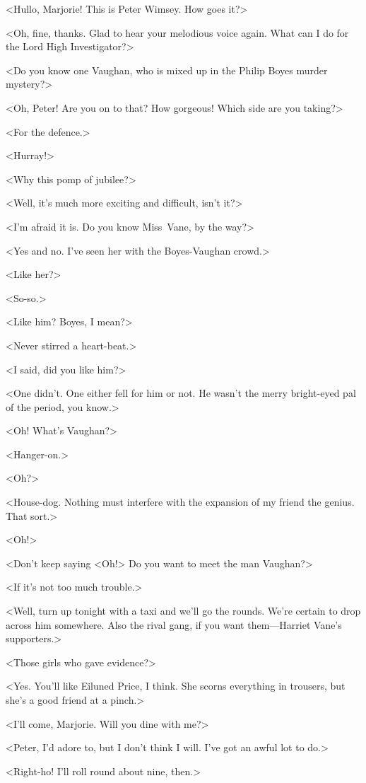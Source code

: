 <Hullo, Marjorie! This is Peter Wimsey. How goes it?>

<Oh, fine, thanks. Glad to hear your melodious voice again. What can I do for the Lord High Investigator?>

<Do you know one Vaughan, who is mixed up in the Philip Boyes murder mystery?>

<Oh, Peter! Are you on to that? How gorgeous! Which side are you taking?>

<For the defence.>

<Hurray!>

<Why this pomp of jubilee?>

<Well, it's much more exciting and difficult, isn't it?>

<I'm afraid it is. Do you know Miss~Vane, by the way?>

<Yes and no. I've seen her with the Boyes-Vaughan crowd.>

<Like her?>

<So-so.>

<Like him? Boyes, I mean?>

<Never stirred a heart-beat.>

<I said, did you like him?>

<One didn't. One either fell for him or not. He wasn't the merry bright-eyed pal of the period, you know.>

<Oh! What's Vaughan?>

<Hanger-on.>

<Oh?>

<House-dog. Nothing must interfere with the expansion of my friend the genius. That sort.>

<Oh!>

<Don't keep saying <Oh!> Do you want to meet the man Vaughan?>

<If it's not too much trouble.>

<Well, turn up tonight with a taxi and we'll go the rounds. We're certain to drop across him somewhere. Also the rival gang, if you want them—Harriet Vane's supporters.>

<Those girls who gave evidence?>

<Yes. You'll like Eiluned Price, I think. She scorns everything in trousers, but she's a good friend at a pinch.>

<I'll come, Marjorie. Will you dine with me?>

<Peter, I'd adore to, but I don't think I will. I've got an awful lot to do.>

<Right-ho! I'll roll round about nine, then.>

